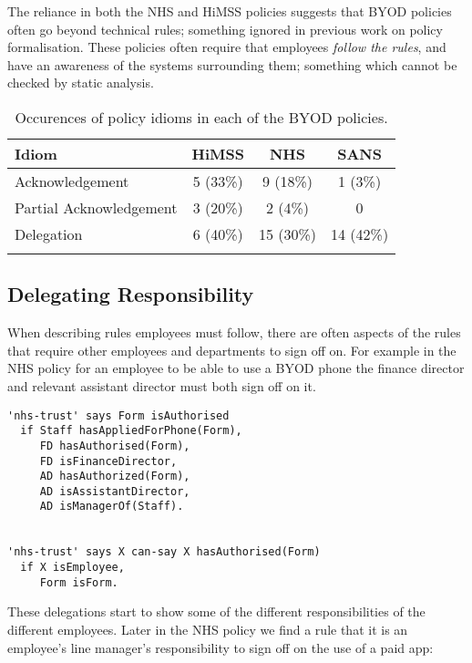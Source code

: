 \documentclass[a4paper]{article}
\begin{document}
The reliance in both the NHS and \ac{HiMSS} policies suggests that \ac{BYOD} policies often go beyond technical rules; something ignored in previous work on policy formalisation.
These policies often require that employees \emph{follow the rules}, and have an awareness of the systems surrounding them;
  something which cannot be checked by static analysis.

\begin{table}\centering
  \begin{tabular}{l c c c}
    \toprule
    Idiom                    & \ac{HiMSS} & NHS       & SANS      \\
    \midrule
    Acknowledgement          & 5 (33\%)   & 9 (18\%)  & 1 (3\%)   \\
    Partial Acknowledgement  & 3 (20\%)   & 2 (4\%)   & 0         \\
    Delegation               & 6 (40\%)   & 15 (30\%) & 14 (42\%) \\
    \bottomrule             \\
  \end{tabular}
  \label{tab:idioms}
  \caption{Occurences of policy idioms in each of the \ac{BYOD} policies.}
\end{table}

\subsection{Delegating Responsibility}

When describing rules employees must follow, there are often aspects of the rules that require other employees and departments to sign off on.
For example in the NHS policy for an employee to be able to use a \ac{BYOD} phone the finance director and relevant assistant director must both sign off on it.

\begin{lstlisting}[title={\footnotesize\textbf{\ac{NHS}}:\itshape
Upon receipt of the completed application form, allocation will need to be authorised by the relevant Assistant Director and the Director of Finance.}]
'nhs-trust' says Form isAuthorised
  if Staff hasAppliedForPhone(Form),
     FD hasAuthorised(Form),
     FD isFinanceDirector,
     AD hasAuthorized(Form),
     AD isAssistantDirector,
     AD isManagerOf(Staff).


'nhs-trust' says X can-say X hasAuthorised(Form)
  if X isEmployee,
     Form isForm.
\end{lstlisting}

These delegations start to show some of the different responsibilities of the different employees.
Later in the NHS policy we find a rule that it is an employee's line manager's responsibility to sign off on the use of a paid app:
\end{document}
